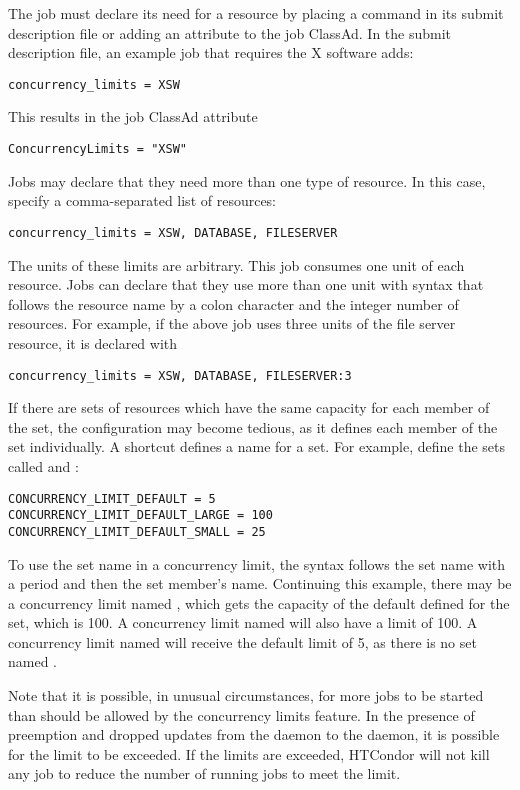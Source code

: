 The job must declare its need for a resource by placing a command
in its submit description file or adding an attribute to the
job ClassAd.
In the submit description file, an example job that requires
the X software adds:
\begin{verbatim}
concurrency_limits = XSW
\end{verbatim}
This results in the job ClassAd attribute
\begin{verbatim}
ConcurrencyLimits = "XSW"
\end{verbatim}

Jobs may declare that they need more than one type of resource.
In this case, specify a comma-separated list of resources:

\begin{verbatim}
concurrency_limits = XSW, DATABASE, FILESERVER
\end{verbatim}

The units of these limits are arbitrary. 
This job consumes one unit of each resource.
Jobs can declare that they use more than one unit with syntax
that follows the resource name by a colon character and the
integer number of resources.  
For example, if the above job uses three units of the file server resource,
it is declared with

\begin{verbatim}
concurrency_limits = XSW, DATABASE, FILESERVER:3
\end{verbatim}

If there are sets of resources which have the same
capacity for each member of the set,
the configuration may become tedious,
as it defines each member of the set individually.
A shortcut defines a name for a set.
For example, define the sets called  and :

\begin{verbatim}
CONCURRENCY_LIMIT_DEFAULT = 5
CONCURRENCY_LIMIT_DEFAULT_LARGE = 100
CONCURRENCY_LIMIT_DEFAULT_SMALL = 25
\end{verbatim}

To use the set name in a concurrency limit,
the syntax follows the set name with a period and then the set member's
name.
Continuing this example, 
there may be a concurrency limit named ,
which gets the capacity of the default defined for the
 set, which is 100. 
A concurrency limit named  will
also have a limit of 100.
A concurrency limit named
 will receive the default limit of 5, as
there is no set named .

Note that it is possible, in unusual circumstances, for more jobs to
be started than should be allowed by the concurrency limits feature.
In the presence of preemption and dropped updates from the
 daemon to the  daemon, it is
possible for the limit to be exceeded. If the limits are exceeded,
HTCondor will not kill any job to reduce the number of running jobs to
meet the limit.
